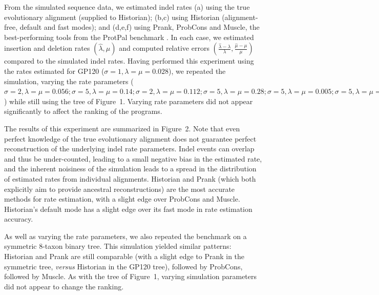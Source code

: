 \documentclass{bioinfo}
\begin{document}
From the simulated sequence data, we estimated indel rates
(a) using the true evolutionary alignment (supplied to Historian);
(b,c) using Historian (alignment-free, default and fast modes);
and
(d,e,f) using Prank, ProbCons and Muscle,
the best-performing tools from the ProtPal benchmark \citep{Westesson2012-zg}.
In each case, we estimated insertion and deletion rates $(\hat{\lambda},\hat{\mu})$ and computed relative errors $(\frac{\hat{\lambda}-\lambda}{\lambda},\frac{\hat{\mu}-\mu}{\mu})$
compared to the simulated indel rates.
Having performed this experiment
using the rates estimated for GP120 ($\sigma=1,\lambda=\mu=0.028$),
we repeated the simulation, varying the rate parameters
($\sigma=2,\lambda=\mu=0.056;
\sigma=5,\lambda=\mu=0.14;
\sigma=2,\lambda=\mu=0.112;
\sigma=5,\lambda=\mu=0.28;
\sigma=5,\lambda=\mu=0.005;
\sigma=5,\lambda=\mu=0.01$)
while still using the tree of Figure~1.
Varying rate parameters did not appear
significantly to affect the ranking of the programs.

The results of this experiment are summarized in Figure~2.
Note that even perfect knowledge of the true evolutionary alignment does not guarantee perfect reconstruction of the underlying indel rate parameters.
Indel events can overlap and thus be under-counted,
leading to a small negative bias in the estimated rate,
and the inherent noisiness of the simulation leads to a spread in the distribution
of estimated rates from individual alignments.
Historian and Prank (which both explicitly aim to provide ancestral reconstructions)
are the most accurate methods for rate estimation,
with a slight edge over ProbCons and Muscle.
Historian's default mode has a slight edge over its fast mode in rate estimation accuracy.

As well as varying the rate parameters,
we also repeated the benchmark on a symmetric 8-taxon binary tree.
This simulation yielded similar patterns:
Historian and Prank are still comparable (with a slight edge to Prank in the
symmetric tree, {\em versus} Historian in the GP120 tree),
followed by ProbCons, followed by Muscle.
As with the tree of Figure~1,
varying simulation parameters did not appear to change the ranking.
\end{document}
